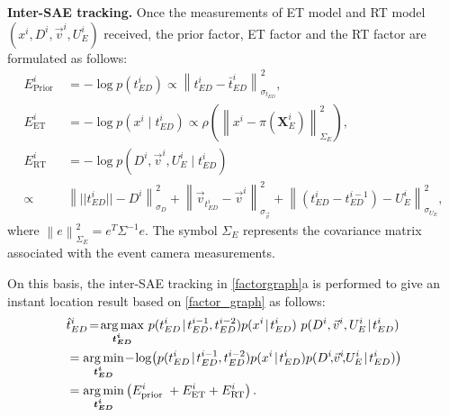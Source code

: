\textbf{Inter-SAE tracking.}
Once the measurements of ET model and RT model $(x^i, D^i, \vec{v}^i, U_E^i)$ received, the prior factor, ET factor and the RT factor are formulated as follows:
\begin{equation}
\begin{aligned}
E^i_{\text {Prior }} & =-\log p\left(t_{ED}^i\right) \propto \left\|t_{ED}^i-\bar{t}_{ED}^i\right\|_{\sigma_{t_{ED}}}^2, \\
E^i_{\mathrm{ET}} & =-\log p\left(x^i \mid t_{ED}^i\right) \propto \rho(\left\| x^i - \pi(\textbf{X}_E^i) \right\|^2_{\Sigma_E}), \\
E^i_{\mathrm{RT}} & =-\log p\left(D^i, \vec{v}^i, U_E^i \mid t_{ED}^i\right) \\
\propto & \left\| ||t_{ED}^i|| \!-\! D^i \right\|^2_{\sigma_D} \!+\!  \left\| \vec{v}_{t_{ED}^i} \!-\! \vec{v}^i \right\|^2_{\sigma_{\vec{v}}} \!+\! \left\| (t_{ED}^i - t_{ED}^{i-1}) \!-\! U_E^i \right\|^2_{\sigma_{U_E}},
\end{aligned}
\end{equation}
where $\left\|e \right\|^2_{\Sigma_E}=e^T\Sigma^{-1} e$.
The symbol $\Sigma_E$ represents the covariance matrix associated with the event camera measurements.

On this basis, the inter-SAE tracking in \fig \ref{factorgraph}a is performed to give an instant location result based on \eqn \eqref{factor_graph} as follows:
\begin{equation}
\begin{aligned}
& \hat{t}_{ED}^i \!=\! \underset{\boldsymbol{t_{ED}^i}}{\arg \max } \ p ( t_{ED}^i \!\mid\! t_{ED}^{i-1}, t_{ED}^{i-2} ) p(x^i \!\mid\! t_{ED}^i) \ p(D^i, \vec{v}^i, U_E^{i} \!\mid\! t_{ED}^i) \\
\vspace{1ex}
& = \underset{\boldsymbol{t_{ED}^i}}{\arg \min } \!-\!\log \!\left(p ( t_{ED}^i \!\mid\! t_{ED}^{i-1}, t_{ED}^{i-2} ) p(x^i \!\mid\! t_{ED}^i) p(D^i\!,\! \vec{v}^i\!,\! U_E^{i} \!\mid\! t_{ED}^i)\right) \\
\vspace{1ex}
& = \underset{\boldsymbol{t_{ED}^i}}{\arg \min } \left( E^i_{\text {prior }} + E^i_{\mathrm{ET}} + E^i_{\mathrm{RT}}\right).
\end{aligned}
\label{inter_frame}
\end{equation}

